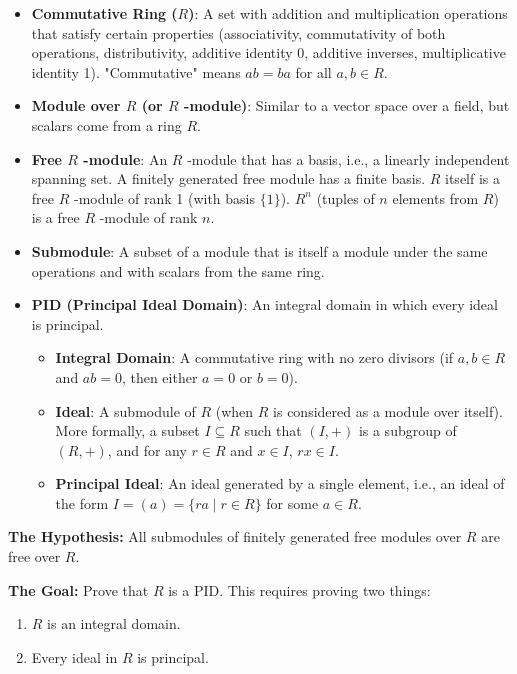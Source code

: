 \begin{itemize}
	\item \textbf{Commutative Ring ($R$)}: A set with addition and multiplication operations that satisfy certain properties (associativity, commutativity of both operations, distributivity, additive identity 0, additive inverses, multiplicative identity 1). "Commutative" means $ab = ba$ for all $a,b \in R$.
	\item \textbf{Module over $R$ (or $R$ -module)}: Similar to a vector space over a field, but scalars come from a ring $R$.
	\item \textbf{Free $R$ -module}: An $R$ -module that has a basis, i.e., a linearly independent spanning set. A finitely generated free module has a finite basis. $R$ itself is a free $R$ -module of rank 1 (with basis $\{1\}$). $R^n$ (tuples of $n$ elements from $R$) is a free $R$ -module of rank $n$.
	\item \textbf{Submodule}: A subset of a module that is itself a module under the same operations and with scalars from the same ring.
	\item \textbf{PID (Principal Ideal Domain)}: An integral domain in which every ideal is principal.
	\begin{itemize}
		\item \textbf{Integral Domain}: A commutative ring with no zero divisors (if $a,b \in R$ and $ab=0$, then either $a=0$ or $b=0$).
		\item \textbf{Ideal}: A submodule of $R$ (when $R$ is considered as a module over itself). More formally, a subset $I \subseteq R$ such that $(I,+)$ is a subgroup of $(R,+)$, and for any $r \in R$ and $x \in I$, $rx \in I$.
		\item \textbf{Principal Ideal}: An ideal generated by a single element, i.e., an ideal of the form $I = (a) = \{ra \mid r \in R\}$ for some $a \in R$.
	\end{itemize}
\end{itemize}

\textbf{The Hypothesis:} All submodules of finitely generated free modules over $R$ are free over $R$.

\textbf{The Goal:} Prove that $R$ is a PID. This requires proving two things:

\begin{enumerate}
	\item $R$ is an integral domain.
	\item Every ideal in $R$ is principal.
\end{enumerate}


